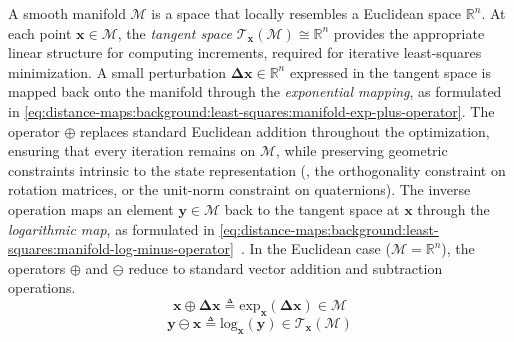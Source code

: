 A smooth manifold $\mathcal{M}$ is a space that locally resembles a Euclidean
space $\mathbb{R}^n$. At each point $\mathbf{x}\in\mathcal{M}$,
the \emph{tangent space}
$\mathcal{T}_{\mathbf{x}}(\mathcal{M})\cong\mathbb{R}^{n}$ provides
the appropriate linear structure for computing increments,
required for iterative least-squares minimization.
A small perturbation $\mathbf{\Delta x}\in\mathbb{R}^{n}$ expressed
in the tangent space is mapped back onto the manifold through the
\emph{exponential mapping}, as formulated in
\eqref{eq:distance-maps:background:least-squares:manifold-exp-plus-operator}.
The operator $\oplus$ replaces standard Euclidean
addition throughout the optimization, ensuring that every iteration remains on
$\mathcal{M}$, while preserving geometric constraints intrinsic to
the state representation (\eg, the orthogonality constraint on rotation
matrices, or the unit-norm constraint on quaternions).
The inverse operation maps an element $\mathbf{y}\in\mathcal{M}$ back to
the tangent space at $\mathbf{x}$ through the \emph{logarithmic map},
as formulated in
\eqref{eq:distance-maps:background:least-squares:manifold-log-minus-operator}~\cite{barfoot:book:2017}.
In the Euclidean case ($\mathcal{M} = \mathbb{R}^n$), the operators $\oplus$ and
$\ominus$ reduce to standard vector addition and subtraction operations.
\begin{equation}
\label{eq:distance-maps:background:least-squares:manifold-exp-plus-operator}
\mathbf{x} \oplus \mathbf{\Delta x}
\triangleq
\mathrm{exp}_{\mathbf{x}}(\mathbf{\Delta x})
\in \mathcal{M}
\end{equation}
\begin{equation}
\label{eq:distance-maps:background:least-squares:manifold-log-minus-operator}
\mathbf{y} \ominus \mathbf{x}
\triangleq
\mathrm{log}_{\mathbf{x}}(\mathbf{y})
\in \mathcal{T}_{\mathbf{x}}(\mathcal{M})
\end{equation}

